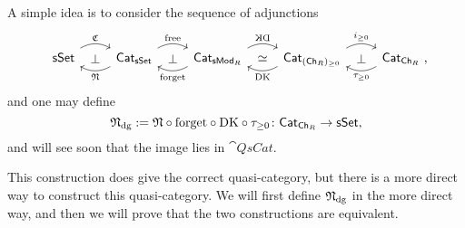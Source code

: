 A simple idea is to consider the sequence of adjunctions
\[\begin{tikzcd}
    \cat{sSet}\ar[r,bend left,start anchor=north east,end anchor=north west,"\mathfrak{C}"]
    \ar[r,phantom,"\bot"] &
    \cat{Cat}\smash{_{\cat{sSet}}}
    \ar[l,bend left,start anchor=south west,end anchor=south east,"\mathfrak{N}"]
    \ar[r,bend left,start anchor=north east,end anchor=north west,"\text{free}"]
    \ar[r,phantom,"\bot"] &
    \cat{Cat}\smash{_{\cat{sMod}_R}}
    \ar[l,bend left,start anchor=south west,end anchor=south east,"\text{forget}"]
    \ar[r,bend left,start anchor=north east,end anchor=north west,"\KD"]
    \ar[r,phantom,"\simeq"] &
    \cat{Cat}\smash{_{(\cat{Ch}_R)_{\geq0}}}
    \ar[l,bend left,start anchor=south west,end anchor=south east,"\operatorname{DK}"]
    \ar[r,bend left,start anchor=north east,end anchor=north west,"i_{\geq0}"]
    \ar[r,phantom,"\bot"] &
    \cat{Cat}\smash{_{\cat{Ch}_R}\rlap{\ ,}}
    \ar[l,bend left,start anchor=south west,end anchor=south east,"\tau_{\geq0}"]
\end{tikzcd}\]
and one may define 
\[ \mathfrak{N}_{\mathrm{dg}}:=\mathfrak{N}\circ\text{forget}\circ{\operatorname{DK}}\circ\tau_{\geq0}\colon\mathsf{Cat}_{\mathsf{Ch}_R}\to\mathsf{sSet}, \]
and will see soon that the image lies in $\cat{QsCat}$.

This construction does give the correct quasi-category,
but there is a more direct way to construct this quasi-category.
We will first define $\mathfrak{N}_{\mathrm{dg}}$ in the more direct way,
and then we will prove that the two constructions are equivalent.

